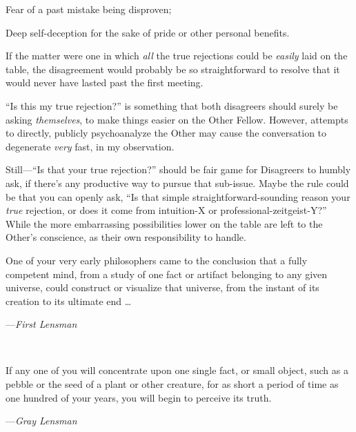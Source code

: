 {
 Fear of a past mistake being disproven;}

{
 Deep self-deception for the sake of pride or other personal
benefits.}

{
 If the matter were one in which \textit{all} the true rejections
could be \textit{easily} laid on the table, the disagreement would
probably be so straightforward to resolve that it would never have
lasted past the first meeting.}

{
 ``Is this my true rejection?''
is something that both disagreers should surely be asking
\textit{themselves}, to make things easier on the Other Fellow.
However, attempts to directly, publicly psychoanalyze the Other may
cause the conversation to degenerate \textit{very} fast, in my
observation.}

{
 Still---``Is that your true
rejection?'' should be fair game for Disagreers to
humbly ask, if there's any productive way to pursue
that sub-issue. Maybe the rule could be that you can openly ask,
``Is that simple straightforward-sounding reason your
\textit{true} rejection, or does it come from intuition-X or
professional-zeitgeist-Y?'' While the more
embarrassing possibilities lower on the table are left to the
Other's conscience, as their own responsibility to
handle.}

\myendsectiontext


{
 One of your very early philosophers came to the conclusion that a
fully competent mind, from a study of one fact or artifact belonging to
any given universe, could construct or visualize that universe, from
the instant of its creation to its ultimate end \ldots}

{\raggedleft
 {}---\textit{First Lensman}
\par}


\bigskip

{
 ~}

{
 If any one of you will concentrate upon one single fact, or small
object, such as a pebble or the seed of a plant or other creature, for
as short a period of time as one hundred of your years, you will begin
to perceive its truth.}

{\raggedleft
 {}---\textit{Gray Lensman}
\par}



